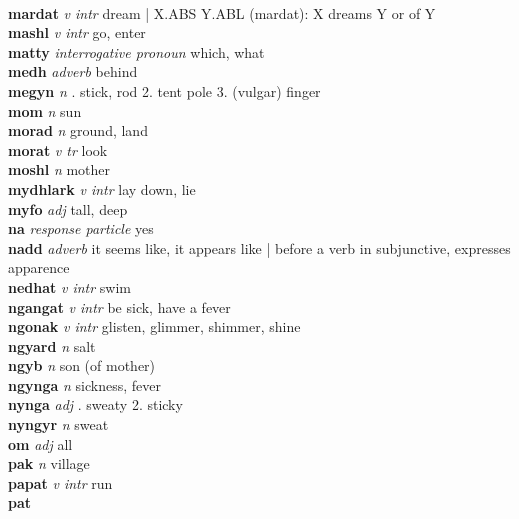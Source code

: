 \\\textbf{mardat}   \emph{v intr} \textperiodcentered dream | X.ABS Y.ABL (mardat): X dreams Y or of Y\\\textbf{mashl}   \emph{v intr} \textperiodcentered go, enter\\\textbf{matty}   \emph{interrogative pronoun} \textperiodcentered which, what\\\textbf{medh}   \emph{adverb} \textperiodcentered behind\\\textbf{megyn}   \emph{n} . stick, rod 2. tent pole 3. (vulgar) finger \\\textbf{mom}   \emph{n} \textperiodcentered sun\\\textbf{morad}   \emph{n} \textperiodcentered ground, land\\\textbf{morat}   \emph{v tr} \textperiodcentered look\\\textbf{moshl}   \emph{n} \textperiodcentered mother\\\textbf{mydhlark}   \emph{v intr} \textperiodcentered lay down, lie\\\textbf{myfo}   \emph{adj} \textperiodcentered tall, deep\\\textbf{na}   \emph{response particle} \textperiodcentered yes\\\textbf{nadd}   \emph{adverb} \textperiodcentered it seems like, it appears like | before a verb in subjunctive, expresses apparence\\\textbf{nedhat}   \emph{v intr} \textperiodcentered swim\\\textbf{ngangat}   \emph{v intr} \textperiodcentered be sick, have a fever\\\textbf{ngonak}   \emph{v intr} \textperiodcentered glisten, glimmer, shimmer, shine\\\textbf{ngyard}   \emph{n} \textperiodcentered salt\\\textbf{ngyb}   \emph{n} \textperiodcentered son (of mother)\\\textbf{ngynga}   \emph{n} \textperiodcentered sickness, fever\\\textbf{nynga}   \emph{adj} . sweaty 2. sticky \\\textbf{nyngyr}   \emph{n} \textperiodcentered sweat\\\textbf{om}   \emph{adj} \textperiodcentered all\\\textbf{pak}   \emph{n} \textperiodcentered village\\\textbf{papat}   \emph{v intr} \textperiodcentered run\\\textbf{pat}  